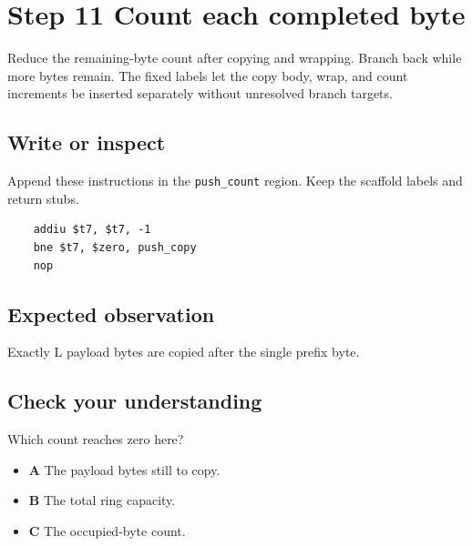 \section{Step 11 Count each completed byte}\label{ring-s11}

Reduce the remaining-byte count after copying and wrapping. Branch back while more bytes remain. The fixed labels let the copy body, wrap, and count increments be inserted separately without unresolved branch targets.

\subsection{Write or inspect}
Append these instructions in the \texttt{push\_count} region. Keep the scaffold labels and return stubs.

\begin{verbatim}
    addiu $t7, $t7, -1
    bne $t7, $zero, push_copy
    nop
\end{verbatim}

\subsection{Expected observation}
Exactly L payload bytes are copied after the single prefix byte.

\subsection{Check your understanding}
Which count reaches zero here?

\begin{itemize}
  \item \textbf{A} The payload bytes still to copy.
  \item \textbf{B} The total ring capacity.
  \item \textbf{C} The occupied-byte count.
\end{itemize}
